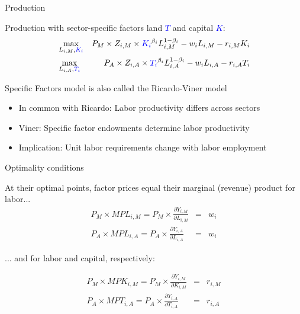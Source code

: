 \documentclass[notes,11pt, aspectratio=169, xcolor=table]{beamer}
\newcommand{\blue}[1]{\textcolor{blue}{#1}}
\newenvironment{wideitemize}{\itemize\addtolength{\itemsep}{10pt}}{\enditemize}
\begin{document}
\begin{frame}{Production}

    \begin{wideitemize}

        \item Production with sector-specific factors land \blue{$T$} and capital \blue{$K$}:
        \begin{eqnarray*}\label{eq: production}
            &\max_{L_{i,M}, \blue{K_{i}}}& P_{M} \times  Z_{i,M} \times \blue{K_{i}}^{\beta_i} L_{i,M}^{1-\beta_i} - w_i L_{i,M} - r_{i,M} K_{i} \\
            &\max_{L_{i,A}, \blue{T_{i}}}& P_{A} \times  Z_{i,A} \times \blue{T_{i}}^{\beta_i} L_{i,A}^{1-\beta_i} - w_i L_{i,A} - r_{i,A} T_{i} 
        \end{eqnarray*}

        \item Specific Factors model is also called the Ricardo-Viner model \\
        \begin{itemize}
            \item In common with Ricardo: Labor productivity differs across sectors
            \item Viner: Specific factor endowments determine labor productivity
            \item Implication: Unit labor requirements change with labor employment
        \end{itemize}
    \end{wideitemize}
\end{frame}

\begin{frame}{Optimality conditions}
\begin{wideitemize}
    
        \item At their optimal points, factor prices equal their marginal (revenue) product for labor...
        \begin{eqnarray*}
            P_M \times MPL_{i,M} = P_M \times  \frac{\partial Y_{i,M}}{\partial L_{i,M}} &=& w_i\\
            P_A \times MPL_{i,A} = P_A \times  \frac{\partial Y_{i,A}}{\partial L_{i,A}} &=& w_i 
        \end{eqnarray*}

        \item ... and for labor and capital, respectively:

                \begin{eqnarray*}
            P_M \times MPK_{i,M} =  P_M \times  \frac{\partial Y_{i,M}}{\partial K_{i,M}} &=&r_{i,M} \\
            P_A \times MPT_{i,A} = P_A \times  \frac{\partial Y_{i,A}}{\partial T_{i,A}} &=& r_{i,A}
        \end{eqnarray*}

\end{wideitemize}    
\end{frame}
\end{document}
